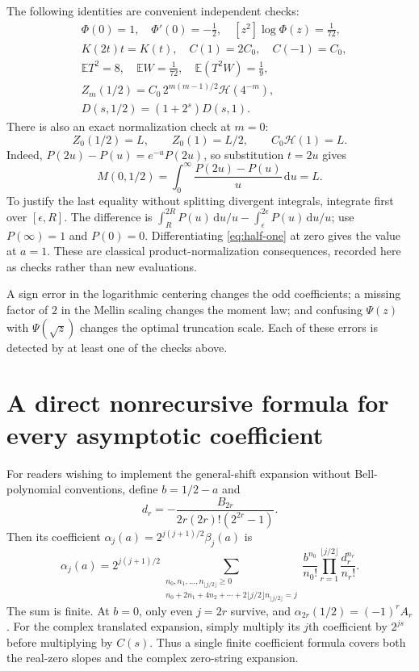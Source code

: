 \documentclass[11pt,a4paper]{article}
\numberwithin{equation}{section}
\theoremstyle{definition}
\theoremstyle{remark}
\newcommand{\E}{\mathbb E}
\newcommand{\dd}{\,\mathrm d}
\newcommand{\calH}{\mathcal H}
\begin{document}
The following identities are convenient independent checks:
\begin{align*}
 &\Phi(0)=1,\quad \Phi'(0)=-\tfrac12,\quad
    [z^2]\log\Phi(z)=\tfrac1{72},\\
 &K(2t)t=K(t),\quad C(1)=2C_0,\quad C(-1)=C_0,\\
 &\E T^2=8,\quad \E W=\tfrac1{72},\quad
    \E(T^2W)=\tfrac19,\\
 &Z_m(1/2)=C_0\,2^{m(m-1)/2}\calH(4^{-m}),\\
 &D(s,1/2)=(1+2^s)D(s,1).
\end{align*}
There is also an exact normalization check at $m=0$:
\[
 Z_0(1/2)=L,\qquad Z_0(1)=L/2,\qquad C_0\calH(1)=L.
\]
Indeed, $P(2u)-P(u)=e^{-u}P(2u)$, so substitution $t=2u$ gives
\[
 M(0,1/2)=\int_0^\infty\frac{P(2u)-P(u)}u\dd u=L.
\]
To justify the last equality without splitting divergent integrals,
integrate first over $[\epsilon,R]$. The difference is
$\int_R^{2R}P(u)\dd u/u-\int_\epsilon^{2\epsilon}P(u)\dd u/u$;
use $P(\infty)=1$ and $P(0)=0$. Differentiating
\cref{eq:half-one} at zero gives the value at $a=1$.
These are classical product-normalization consequences, recorded
here as checks rather than new evaluations.

A sign error in the logarithmic centering changes the odd
coefficients; a missing factor of $2$ in the Mellin scaling changes
the moment law; and confusing $\Psi(z)$ with $\Psi(\sqrt z)$ changes
the optimal truncation scale. Each of these errors is detected by
at least one of the checks above.

\section{A direct nonrecursive formula for every asymptotic coefficient}
For readers wishing to implement the general-shift expansion without
Bell-polynomial conventions, define $b=1/2-a$ and
\[
 d_r=-\frac{B_{2r}}{2r(2r)!(2^{2r}-1)}.
\]
Then its coefficient $\alpha_j(a)=2^{j(j+1)/2}\beta_j(a)$ is
\begin{equation}
 \boxed{\displaystyle
 \alpha_j(a)=2^{j(j+1)/2}
 \sum_{\substack{n_0,n_1,\ldots,n_{\lfloor j/2\rfloor}\ge0\\
 n_0+2n_1+4n_2+\cdots+2\lfloor j/2\rfloor n_{\lfloor j/2\rfloor}=j}}
 \frac{b^{n_0}}{n_0!}
 \prod_{r=1}^{\lfloor j/2\rfloor}\frac{d_r^{n_r}}{n_r!}.}
 \label{eq:alpha-final}
\end{equation}
The sum is finite. At $b=0$, only even $j=2r$ survive, and
$\alpha_{2r}(1/2)=(-1)^rA_r$. For the complex translated expansion,
simply multiply its $j$th coefficient by $2^{js}$ before multiplying
by $C(s)$. Thus a single finite coefficient formula covers both the
real-zero slopes and the complex zero-string expansion.
\end{document}
